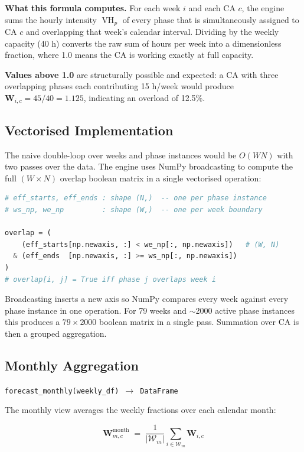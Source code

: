 \documentclass[12pt,a4paper]{report}
\DeclareMathOperator{\vh}{VH}
\begin{document}
\textbf{What this formula computes.}
For each week $i$ and each CA $c$, the engine sums the hourly intensity
$\vh_p$ of every phase that is simultaneously assigned to CA $c$ and
overlapping that week's calendar interval. Dividing by the weekly capacity
(40 h) converts the raw sum of hours per week into a dimensionless
fraction, where 1.0 means the CA is working exactly at full capacity.

\textbf{Values above 1.0} are structurally possible and expected: a CA
with three overlapping phases each contributing 15 h/week would produce
$\mathbf{W}_{i,c} = 45/40 = 1.125$, indicating an overload of 12.5\%.

\subsection{Vectorised Implementation}

The naive double-loop over weeks and phase instances would be $O(WN)$
with two passes over the data. The engine uses NumPy broadcasting to
compute the full $(W \times N)$ overlap boolean matrix in a single
vectorised operation:

\begin{lstlisting}[language=Python, caption={Vectorised overlap computation}]
# eff_starts, eff_ends : shape (N,)  -- one per phase instance
# ws_np, we_np         : shape (W,)  -- one per week boundary

overlap = (
    (eff_starts[np.newaxis, :] < we_np[:, np.newaxis])   # (W, N)
  & (eff_ends  [np.newaxis, :] >= ws_np[:, np.newaxis])
)
# overlap[i, j] = True iff phase j overlaps week i
\end{lstlisting}

Broadcasting inserts a new axis so NumPy compares every week against
every phase instance in one operation. For 79 weeks and $\sim$2000 active
phase instances this produces a $79 \times 2000$ boolean matrix
in a single pass. Summation over CA is then a grouped aggregation.

\subsection{Monthly Aggregation}

\texttt{forecast\_monthly(weekly\_df) $\to$ DataFrame}

The monthly view averages the weekly fractions over each calendar month:

\[
  \mathbf{W}^{\text{month}}_{m,c}
  \;=\;
  \frac{1}{|\mathcal{W}_m|}
  \sum_{i \in \mathcal{W}_m} \mathbf{W}_{i,c}
\]
\end{document}
